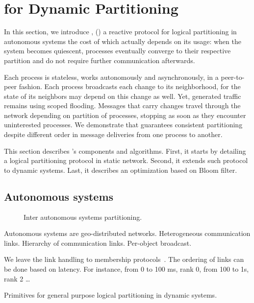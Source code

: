 
\section{\NAME for Dynamic Partitioning}
\label{sec:proposal}

In this section, we introduce \NAME, () a reactive
protocol for logical partitioning in autonomous systems the cost of
which actually depends on its usage: when the system becomes
quiescent, processes eventually converge to their respective partition
and do not require further communication afterwards.

Each process is stateless, works autonomously and asynchronously, in a
peer-to-peer fashion. Each process broadcasts each change to its
neighborhood, for the state of its neighbors may depend on this change
as well. Yet, generated traffic remains  using scoped
flooding. Messages that carry changes travel through the network
depending on partition of processes, stopping as soon as they
encounter uninterested processes. We demonstrate that \NAME guarantees
consistent partitioning despite different order in message deliveries
from one process to another.

This section describes \NAME's components and algorithms. First, it
starts by detailing a logical partitioning protocol in static
network. Second, it extends such protocol to dynamic systems. Last, it
describes an optimization based on Bloom filter. 



\subsection{Autonomous systems}

\begin{figure}
  \centering
  \caption{\label{fig:AS}Inter autonomous systems partitioning. }
\end{figure}

Autonomous systems are geo-distributed networks. Heterogeneous
communication links. Hierarchy of communication links. Per-object
broadcast.

We leave the link handling to membership protocols~\REF. The ordering
of links can be done based on latency. For instance, from 0 to 100 ms,
rank 0, from 100 to 1s, rank 2 \ldots

\begin{algorithm}
  
  \caption{\label{algo:aaaa}Primitives for general purpose logical
    partitioning in dynamic systems.}
\end{algorithm}

